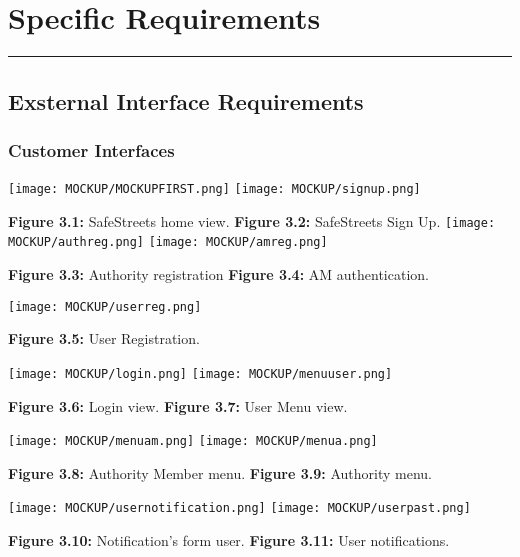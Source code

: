 \documentclass[12pt]{article}
\begin{document}
\newpage
\section{Specific Requirements}
\hrule
\vspace{8mm}
\subsection{Exsternal Interface Requirements}
\vspace{2mm}
\subsubsection{Customer Interfaces}
\vspace{3mm}
		 
		 \texttt{[image: MOCKUP/MOCKUPFIRST.png]}                  \hfill \texttt{[image: MOCKUP/signup.png]}
		 
		 \textbf{Figure 3.1:} SafeStreets home view.  \hfill \textbf{Figure 3.2:} SafeStreets Sign Up.
\newpage
 \texttt{[image: MOCKUP/authreg.png]}                  \hfill \texttt{[image: MOCKUP/amreg.png]}
		 
		 \textbf{Figure 3.3:} Authority registration   \hfill \textbf{Figure 3.4:} AM authentication.
		\begin{center}
  \texttt{[image: MOCKUP/userreg.png]}                  
  
		 \textbf{Figure 3.5:} User Registration.
	\end{center}


\newpage
 	 \texttt{[image: MOCKUP/login.png]}                  \hfill \texttt{[image: MOCKUP/menuuser.png]}
		 
		 \textbf{Figure 3.6:} Login view.  \hfill \textbf{Figure 3.7:} User Menu view.
		
  \texttt{[image: MOCKUP/menuam.png]}                  \hfill \texttt{[image: MOCKUP/menua.png]}
		 
		 \textbf{Figure 3.8:} Authority Member menu.  \hfill \textbf{Figure 3.9:} Authority menu.
		 

\newpage
 	 \texttt{[image: MOCKUP/usernotification.png]}                  \hfill \texttt{[image: MOCKUP/userpast.png]}
		 
		 \textbf{Figure 3.10:} Notification's form user.  \hfill \textbf{Figure 3.11:} User notifications.
		
\end{document}
